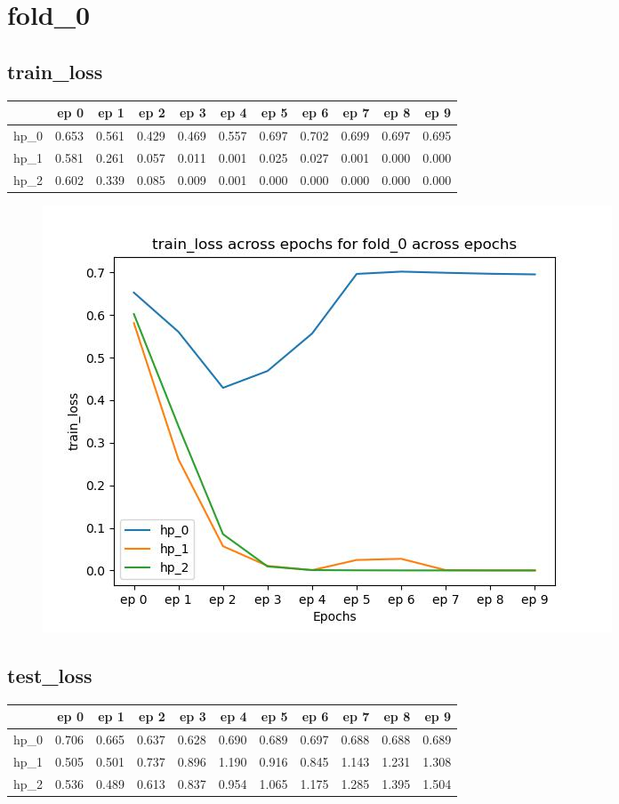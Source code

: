 \documentclass{article}
\begin{document}
\section{fold\_0}
\subsection{train\_loss}
\begin{tabular}{lrrrrrrrrrr}
\toprule
{} &   ep 0 &   ep 1 &   ep 2 &   ep 3 &   ep 4 &   ep 5 &   ep 6 &   ep 7 &   ep 8 &   ep 9 \\
\midrule
hp\_0 &  0.653 &  0.561 &  0.429 &  0.469 &  0.557 &  0.697 &  0.702 &  0.699 &  0.697 &  0.695 \\
hp\_1 &  0.581 &  0.261 &  0.057 &  0.011 &  0.001 &  0.025 &  0.027 &  0.001 &  0.000 &  0.000 \\
hp\_2 &  0.602 &  0.339 &  0.085 &  0.009 &  0.001 &  0.000 &  0.000 &  0.000 &  0.000 &  0.000 \\
\bottomrule
\end{tabular}

\begin{figure}[H]
\includegraphics[scale = 0.75]{fold_0/train_loss}
\end{figure}
\subsection{test\_loss}
\begin{tabular}{lrrrrrrrrrr}
\toprule
{} &   ep 0 &   ep 1 &   ep 2 &   ep 3 &   ep 4 &   ep 5 &   ep 6 &   ep 7 &   ep 8 &   ep 9 \\
\midrule
hp\_0 &  0.706 &  0.665 &  0.637 &  0.628 &  0.690 &  0.689 &  0.697 &  0.688 &  0.688 &  0.689 \\
hp\_1 &  0.505 &  0.501 &  0.737 &  0.896 &  1.190 &  0.916 &  0.845 &  1.143 &  1.231 &  1.308 \\
hp\_2 &  0.536 &  0.489 &  0.613 &  0.837 &  0.954 &  1.065 &  1.175 &  1.285 &  1.395 &  1.504 \\
\bottomrule
\end{tabular}
\end{document}
